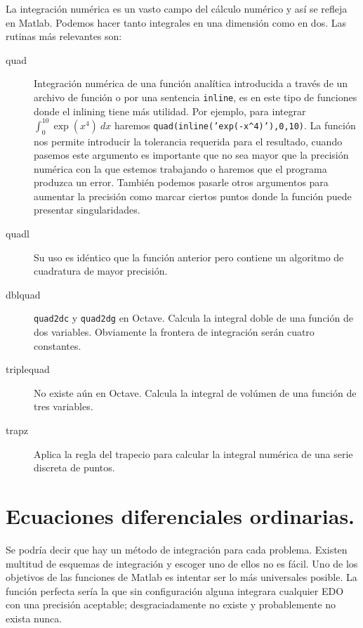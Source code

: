 La integración numérica es un vasto campo del cálculo numérico y así
se refleja en Matlab. Podemos hacer tanto integrales en una dimensión
como en dos. Las rutinas más relevantes son:

\begin{description}
\item [quad\texttt{}]Integración numérica de una función analítica
introducida a través de un archivo de función o por una sentencia
\texttt{inline}, es en este tipo de funciones donde el inlining tiene
más utilidad. Por ejemplo, para integrar $\int_{0}^{10}\exp(x^{4})\  dx$
haremos \texttt{quad(inline('exp(-x\textasciicircum{}4)'),0,10)}.
La función nos permite introducir la tolerancia requerida para el
resultado, cuando pasemos este argumento es importante que no sea
mayor que la precisión numérica con la que estemos trabajando o haremos
que el programa produzca un error. También podemos pasarle otros argumentos
para aumentar la precisión como marcar ciertos puntos donde la función
puede presentar singularidades.
\item [quadl\texttt{}]Su uso es idéntico que la función anterior
pero contiene un algoritmo de cuadratura de mayor precisión.
\item [dblquad\texttt{}]\texttt{quad2dc}
y \texttt{quad2dg} en Octave. Calcula la integral
doble de una función de dos variables. Obviamente la frontera de integración
serán cuatro constantes.
\item [triplequad\texttt{}]No existe aún en Octave.
Calcula la integral de volúmen de una función de tres variables.
\item [trapz\texttt{}]Aplica la regla del trapecio para calcular
la integral numérica de una serie discreta de puntos.
\end{description}

\section{Ecuaciones diferenciales ordinarias.}

Se podría decir que hay un método de integración para cada problema.
Existen multitud de esquemas de integración y escoger uno de ellos
no es fácil. Uno de los objetivos de las funciones de Matlab es intentar
ser lo más universales posible. La función perfecta sería la que sin
configuración alguna integrara cualquier EDO con una precisión
aceptable; desgraciadamente no existe y probablemente no exista nunca.

